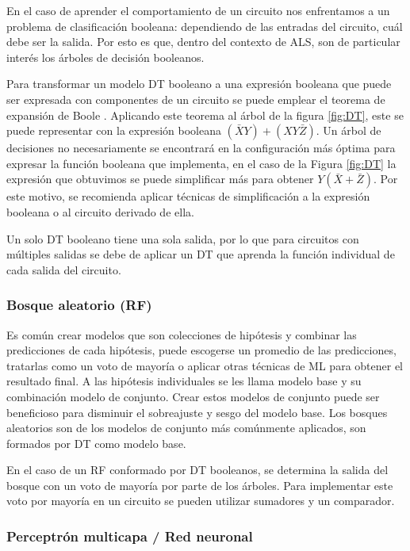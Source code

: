 En el caso de aprender el comportamiento de un circuito nos enfrentamos a un
problema de clasificación booleana: dependiendo de las entradas del circuito,
cuál debe ser la salida. Por esto es que, dentro del contexto de ALS, son de
particular interés los árboles de decisión booleanos.

Para transformar un modelo DT booleano a una expresión booleana que puede ser
expresada con componentes de un circuito se puede emplear el teorema de
expansión de Boole \cite{boole_investigation_1854}. Aplicando este teorema al
árbol de la figura \ref{fig:DT}, este se puede representar con la expresión
booleana $(\bar{X}Y) + (XY\bar{Z})$. Un árbol de decisiones no necesariamente
se encontrará en la configuración más óptima para expresar la función booleana
que implementa, en el caso de la Figura \ref{fig:DT} la expresión que
obtuvimos se puede simplificar más para obtener $Y(\bar{X} + \bar{Z})$. Por
este motivo, se recomienda aplicar técnicas de simplificación a la expresión
booleana o al circuito derivado de ella.

Un solo DT booleano tiene una sola salida, por lo que para circuitos con
múltiples salidas se debe de aplicar un DT que aprenda la función individual de
cada salida del circuito.

\subsubsection{Bosque aleatorio (RF)}

Es común crear modelos que son colecciones de hipótesis y combinar las
predicciones de cada hipótesis, puede escogerse un promedio de las
predicciones, tratarlas como un voto de mayoría o aplicar otras técnicas de ML
para obtener el resultado final. A las hipótesis individuales se les llama
modelo base y su combinación modelo de conjunto.
Crear estos modelos de conjunto puede ser beneficioso para disminuir el
sobreajuste y sesgo del modelo base.
Los bosques aleatorios son de los modelos de conjunto más comúnmente aplicados,
son formados por DT como modelo base. \cite{russell2016artificial}

En el caso de un RF conformado por DT booleanos, se determina la salida del
bosque con un voto de mayoría por parte de los árboles. Para implementar este
voto por mayoría en un circuito se pueden utilizar sumadores y un comparador.

\subsubsection{Perceptrón multicapa / Red neuronal}

